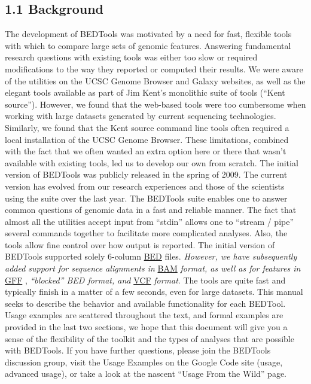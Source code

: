 \documentclass[letterpaper,10pt,english]{sphinxmanual}
\begin{document}
\subsection{1.1 Background}
\label{content/overview:background}
The development of BEDTools was motivated by a need for fast, flexible tools with which to compare large sets of genomic
features. Answering fundamental research questions with existing tools was either too slow or required modifications to the
way they reported or computed their results. We were aware of the utilities on the UCSC Genome Browser and Galaxy websites, as
well as the elegant tools available as part of Jim Kent’s monolithic suite of tools (“Kent source”). However, we found that
the web-based tools were too cumbersome when working with large datasets generated by current sequencing technologies.
Similarly, we found that the Kent source command line tools often required a local installation of the UCSC Genome Browser.
These limitations, combined with the fact that we often wanted an extra option here or there that wasn’t available with
existing tools, led us to develop our own from scratch. The initial version of BEDTools was publicly released in the spring of
2009. The current version has evolved from our research experiences and those of the scientists using the suite over the last
year. The BEDTools suite enables one to answer common questions of genomic data in a fast and reliable manner. The fact that
almost all the utilities accept input from “stdin” allows one to “stream / pipe” several commands together to facilitate more
complicated analyses. Also, the tools allow fine control over how output is reported. The initial version of BEDTools
supported solely 6-column \href{http://genome.ucsc.edu/FAQ/FAQformat\#format1}{BED} files. \emph{However, we have subsequently added support for sequence alignments in} \href{http://samtools.sourceforge.net/}{BAM}
\emph{format, as well as for features in} \href{http://genome.ucsc.edu/FAQ/FAQformat\#format3}{GFF} , \emph{“blocked” BED format, and}
\href{http://www.1000genomes.org/wiki/Analysis/Variant\%20Call\%20Format/vcf-variant-call-format-version-41}{VCF} \emph{format}.
The tools are quite fast and typically finish in a matter of a few seconds, even for large datasets. This manual seeks to describe the behavior and
available functionality for each BEDTool. Usage examples are scattered throughout the text, and formal examples are
provided in the last two sections, we hope that this document will give you a sense of the flexibility of
the toolkit and the types of analyses that are possible with BEDTools. If you have further questions, please join the BEDTools
discussion group, visit the Usage Examples on the Google Code site (usage, advanced usage), or take a look at the nascent
“Usage From the Wild” page.
\end{document}
